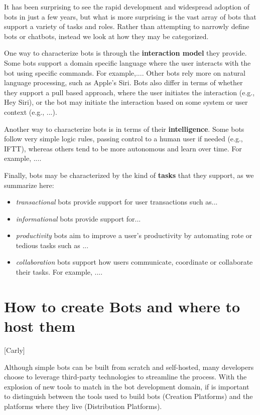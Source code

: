\documentclass{sig-alternate}
\begin{document}


It has been surprising to see the rapid development and widespread adoption of bots in just a few years, but what is more surprising is the vast array of bots that support a variety of tasks and roles.  
Rather than attempting to narrowly define bots or chatbots, instead we look at how they may be categorized. 

One way to characterize bots is through the \textbf{interaction model} they provide. 
Some bots support a domain specific language where the user interacts with the bot using specific commands.  For example,.... 
Other bots rely more on natural language processing, such as Apple's Siri.
Bots also differ in terms of whether they support a pull based approach, where the user initiates the interaction (e.g., Hey Siri), or the bot may initiate the interaction based on some system or user context (e.g., ...). 

Another way to characterize bots is in terms of their \textbf{intelligence}.  Some bots follow very simple logic rules, passing control to a human user if needed (e.g., IFTT), whereas others tend to be more autonomous and learn over time.  For example, ....

Finally, bots may be characterized by the kind of \textbf{tasks} that they support, as we summarize here: 
\begin{itemize}
\item \emph{transactional} bots provide support for user transactions such as...
\item \emph{informational} bots provide support for...
\item \emph{productivity} bots aim to improve a user's productivity by automating rote or tedious tasks such as ... 
\item \emph{collaboration} bots support how users communicate, coordinate or collaborate their tasks.  For example, ....
\end{itemize}
	
	

\section{How to create Bots and where to host them}
	[Carly]

	Although simple bots can be built from scratch and self-hosted, many developers choose to leverage third-party technologies to streamline the process. With the explosion of new tools to match in the bot development domain, if is important to distinguish between the tools used to build bots (Creation Platforms) and the platforms where they live (Distribution Platforms).
\end{document}
